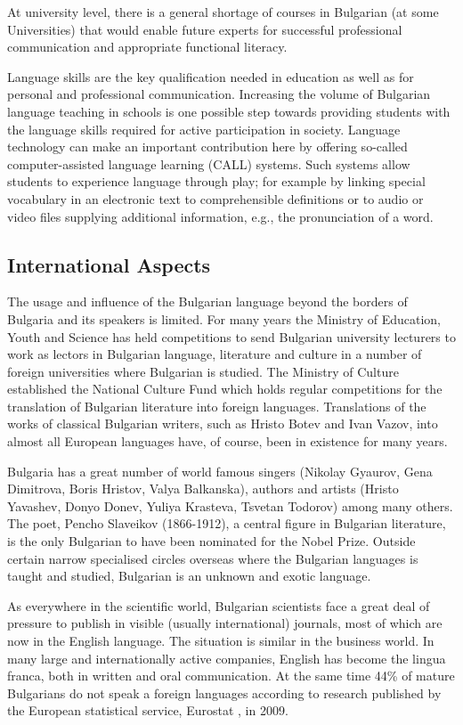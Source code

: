 \documentclass[]{../../metanetpaper}
\begin{document}
\begin{multicols}{2}
At university level, there is a general shortage of courses in Bulgarian (at some Universities) that would enable future experts for successful professional communication and appropriate functional literacy.

Language skills are the key qualification needed in education as well as for personal and professional communication. Increasing the volume of Bulgarian language teaching in schools is one possible step towards providing students with the language skills required for active participation in society. Language technology can make an important contribution here by offering so-called computer-assisted language learning (CALL) systems. Such systems allow students to experience language through play; for example by linking special vocabulary in an electronic text to comprehensible definitions or to audio or video files supplying additional information, e.g., the pronunciation of a word. 

\subsection{International Aspects}

The usage and influence of the Bulgarian language beyond the borders of Bulgaria and its speakers is limited. For many years the Ministry of Education, Youth and Science has held competitions to send Bulgarian university lecturers to work as lectors in Bulgarian language, literature and culture in a number of foreign universities where Bulgarian is studied. The Ministry of Culture established the National Culture Fund which holds regular competitions for the translation of Bulgarian literature into foreign languages. Translations of the works of classical Bulgarian writers, such as Hristo Botev and Ivan Vazov, into almost all European languages have, of course, been in existence for many years. 

Bulgaria has a great number of world famous singers (Nikolay Gyaurov, Gena Dimitrova, Boris Hristov, Valya Balkanska), authors and artists (Hristo Yavashev, Donyo Donev, Yuliya Krasteva, Tsvetan Todorov) among many others. The poet, Pencho Slaveikov (1866-1912), a central figure in Bulgarian literature, is the only Bulgarian to have been nominated for the Nobel Prize. Outside certain narrow specialised circles overseas where the Bulgarian languages is taught and studied, Bulgarian is an unknown and exotic language.

As everywhere in the scientific world, Bulgarian scientists face a great deal of pressure to publish in visible (usually international) journals, most of which are now in the English language. The situation is similar in the business world. In many large and internationally active companies, English has become the lingua franca, both in written and oral communication. At the same time 44\% of mature Bulgarians do not speak a foreign languages according to research published by the European statistical service, Eurostat \cite{epp}, in 2009. 


\end{multicols}
\end{document}
